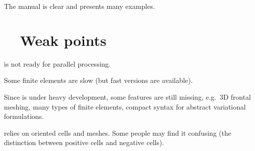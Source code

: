 The manual is clear and presents many examples.


\section{~~Weak points}\label{\numb section 1.\numb parag 10}

{\ManiFEM} is not ready for parallel processing.

Some finite elements are slow (but fast versions are available).

Since {\maniFEM} is under heavy development, some features are still missing,
e.g.\ 3D frontal meshing, many types of finite elements, compact syntax for abstract variational
formulations.

{\ManiFEM} relies on oriented cells and meshes.
Some people may find it confusing (the distinction between positive cells and negative cells).
